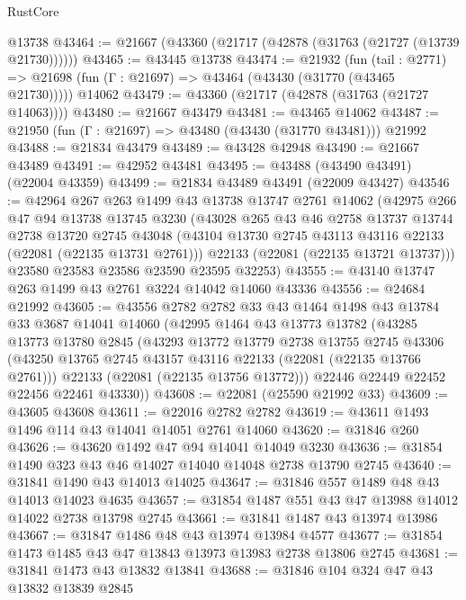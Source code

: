 \begin{lexlean}{RustCore}
\begin{coremodule}
    @13738
@43464 := @21667 (@43360 (@21717 (@42878 (@31763 (@21727 (@13739 @21730))))))
@43465 := @43445 @13738
@43474 := @21932
    (fun (tail : @2771) => @21698 (fun (Γ : @21697) => @43464 (@43430 (@31770 (@43465 @21730)))))
    @14062
@43479 := @43360 (@21717 (@42878 (@31763 (@21727 @14063))))
@43480 := @21667 @43479
@43481 := @43465 @14062
@43487 := @21950 (fun (Γ : @21697) => @43480 (@43430 (@31770 @43481))) @21992
@43488 := @21834 @43479
@43489 := @43428 @42948
@43490 := @21667 @43489
@43491 := @42952 @43481
@43495 := @43488 (@43490 @43491) (@22004 @43359)
@43499 := @21834 @43489 @43491 (@22009 @43427)
@43546 := @42964
    @267
    @263
    @1499
    @43
    @13738
    @13747
    @2761
    @14062
    (@42975
      @266
      @47
      @94
      @13738
      @13745
      @3230
      (@43028
        @265
        @43
        @46
        @2758
        @13737
        @13744
        @2738
        @13720
        @2745
        @43048
        (@43104 @13730 @2745 @43113 @43116 @22133 (@22081 (@22135 @13731 @2761)))
        @22133
        (@22081 (@22135 @13721 @13737)))
      @23580
      @23583
      @23586
      @23590
      @23595
      @32253)
@43555 := @43140 @13747 @263 @1499 @43 @2761 @3224 @14042 @14060 @43336
@43556 := @24684 @21992
@43605 := @43556
    @2782
    @2782
    @33
    @43
    @1464
    @1498
    @43
    @13784
    @33
    @3687
    @14041
    @14060
    (@42995
      @1464
      @43
      @13773
      @13782
      (@43285
        @13773
        @13780
        @2845
        (@43293
          @13772
          @13779
          @2738
          @13755
          @2745
          @43306
          (@43250 @13765 @2745 @43157 @43116 @22133 (@22081 (@22135 @13766 @2761)))
          @22133
          (@22081 (@22135 @13756 @13772)))
        @22446
        @22449
        @22452
        @22456
        @22461
        @43330))
@43608 := @22081 (@25590 @21992 @33)
@43609 := @43605 @43608
@43611 := @22016 @2782 @2782
@43619 := @43611 @1493 @1496 @114 @43 @14041 @14051 @2761 @14060
@43620 := @31846 @260
@43626 := @43620 @1492 @47 @94 @14041 @14049 @3230
@43636 := @31854 @1490 @323 @43 @46 @14027 @14040 @14048 @2738 @13790 @2745
@43640 := @31841 @1490 @43 @14013 @14025
@43647 := @31846 @557 @1489 @48 @43 @14013 @14023 @4635
@43657 := @31854 @1487 @551 @43 @47 @13988 @14012 @14022 @2738 @13798 @2745
@43661 := @31841 @1487 @43 @13974 @13986
@43667 := @31847 @1486 @48 @43 @13974 @13984 @4577
@43677 := @31854 @1473 @1485 @43 @47 @13843 @13973 @13983 @2738 @13806 @2745
@43681 := @31841 @1473 @43 @13832 @13841
@43688 := @31846 @104 @324 @47 @43 @13832 @13839 @2845

\end{coremodule}
\end{lexlean}
